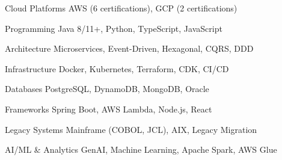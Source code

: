 
\begin{cvskills}

  \cvskill
  {Cloud Platforms} %
  {AWS (6 certifications), GCP (2 certifications)} %
  
  \cvskill
  {Programming} %
  {Java 8/11+, Python, TypeScript, JavaScript} %
  
  \cvskill
  {Architecture} %
  {Microservices, Event-Driven, Hexagonal, CQRS, DDD} %
  
  \cvskill
  {Infrastructure} %
  {Docker, Kubernetes, Terraform, CDK, CI/CD} %

  \cvskill
  {Databases} %
  {PostgreSQL, DynamoDB, MongoDB, Oracle} %

  \cvskill
  {Frameworks} %
  {Spring Boot, AWS Lambda, Node.js, React} %

  \cvskill
  {Legacy Systems} %
  {Mainframe (COBOL, JCL), AIX, Legacy Migration} %

  \cvskill
  {AI/ML \& Analytics} %
  {GenAI, Machine Learning, Apache Spark, AWS Glue} %

\end{cvskills}
